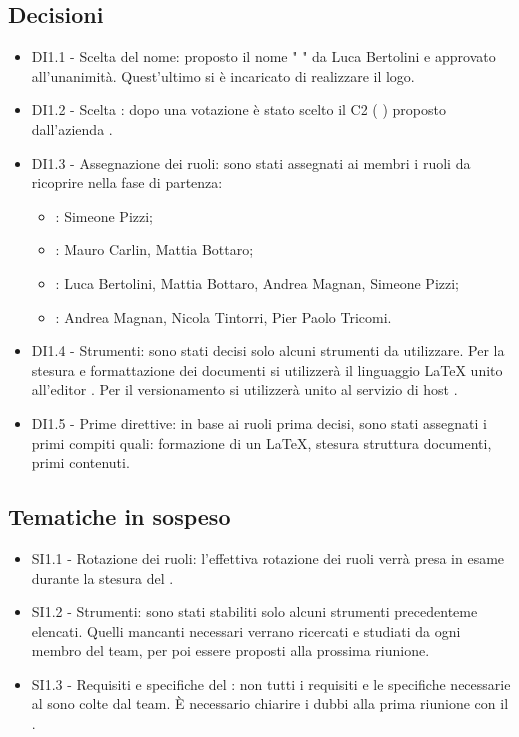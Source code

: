\documentclass[a4paper,titlepage]{article}
\begin{document}
 \subsection{Decisioni}
 \begin{itemize}
  \item DI1.1 - Scelta del nome: proposto il nome " \GRUPPO{} " da Luca Bertolini e approvato all'unanimità. Quest'ultimo si è incaricato di realizzare il logo.
  \item DI1.2 - Scelta : dopo una votazione è stato scelto il  C2 ( \PROGETTO) proposto dall'azienda \PROPONENTE.
  \item DI1.3 - Assegnazione dei ruoli: sono stati assegnati ai membri i ruoli da ricoprire nella fase di partenza:
  \begin{itemize}
  \item \RESP: Simeone Pizzi;
  \item \AMMP: Mauro Carlin, Mattia Bottaro;
  \item \VERP: Luca Bertolini, Mattia Bottaro, Andrea Magnan, Simeone Pizzi;
  \item \ANP: Andrea Magnan, Nicola Tintorri, Pier Paolo Tricomi.
  \end{itemize}
  \item DI1.4 - Strumenti: sono stati decisi solo alcuni strumenti da utilizzare. Per la stesura e formattazione dei documenti si utilizzerà il linguaggio \LaTeX{}{} unito all'editor . Per il versionamento si utilizzerà  unito al servizio di host . 
  \item DI1.5 - Prime direttive: in base ai ruoli prima decisi, sono stati assegnati i primi compiti quali: formazione di un  \LaTeX{}{}, stesura struttura documenti, primi contenuti.
 \end{itemize}

\subsection{Tematiche in sospeso} 
  \begin{itemize}
  \item SI1.1 - Rotazione dei ruoli: l'effettiva rotazione dei ruoli verrà presa in esame durante la stesura del \PPdoc.
  \item SI1.2 - Strumenti: sono stati stabiliti solo alcuni strumenti precedenteme elencati. Quelli mancanti necessari verrano ricercati e studiati da ogni membro del team, per poi essere proposti alla prossima riunione.
  \item SI1.3 - Requisiti e specifiche del : non tutti i requisiti e le specifiche necessarie al  sono colte dal team. È necessario chiarire i dubbi alla prima riunione con il .
  \end{itemize}
\end{document}
